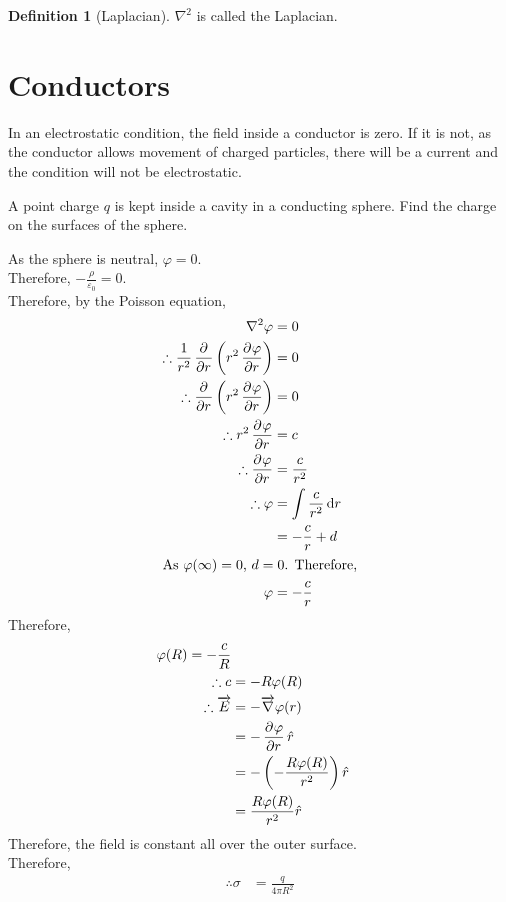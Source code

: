 \documentclass[fleqn, a4paper, 8pt, twoside]{amsart}
\theoremstyle{definition}
\newtheorem{definition}{Definition}
\theoremstyle{theorem}
\begin{document}
\begin{multicols}{2}
\begin{spacing}{0.6}
\begin{definition}[Laplacian]
	$\nabla^2$ is called the Laplacian.
\end{definition}

\section{Conductors}

In an electrostatic condition, the field inside a conductor is zero.
If it is not, as the conductor allows movement of charged particles, there will be a current and the condition will not be electrostatic.

\begin{question}
	A point charge $q$ is kept inside a cavity in a conducting sphere.
	Find the charge on the surfaces of the sphere.
\end{question}

\begin{solution}
	As the sphere is neutral, $\varphi = 0$.\\
	Therefore, $-\frac{\rho}{\varepsilon_0} = 0$.\\
	Therefore, by the Poisson equation,
	\begin{align*}
		\nabla^2 \varphi &= 0\\
		\therefore \frac{1}{r^2} \dpd{}{r} \left( r^2 \dpd{\varphi}{r} \right) &= 0\\
		\therefore \dpd{}{r} \left( r^2 \dpd{\varphi}{r} \right) &= 0\\
		\therefore r^2 \dpd{\varphi}{r} &= c\\
		\therefore \dpd{\varphi}{r} &= \frac{c}{r^2}\\
		\therefore \varphi &= \int \frac{c}{r^2} \dif r\\
		&= -\frac{c}{r} + d\\
		\intertext{As $\varphi(\infty) = 0$, $d = 0$. Therefore,}
		\varphi &= -\frac{c}{r}
	\end{align*}
	Therefore,
	\begin{align*}
		\varphi(R) = -\frac{c}{R}\\
		\therefore c &= -R \varphi(R)\\
		\therefore \overrightarrow{E} &= -\overrightarrow{\nabla} \varphi(r)\\
		&= -\dpd{\varphi}{r} \hat{r}\\
		&= -\left( -\frac{R \varphi(R)}{r^2} \right) \hat{r}\\
		&= \frac{R \varphi(R)}{r^2} \hat{r}
	\end{align*}
	Therefore, the field is constant all over the outer surface.\\
	Therefore, 
	\begin{align*}
		\therefore \sigma &= \frac{q}{4 \pi R^2}
	\end{align*}
\end{solution}


\end{spacing}
\end{multicols}
\end{document}
